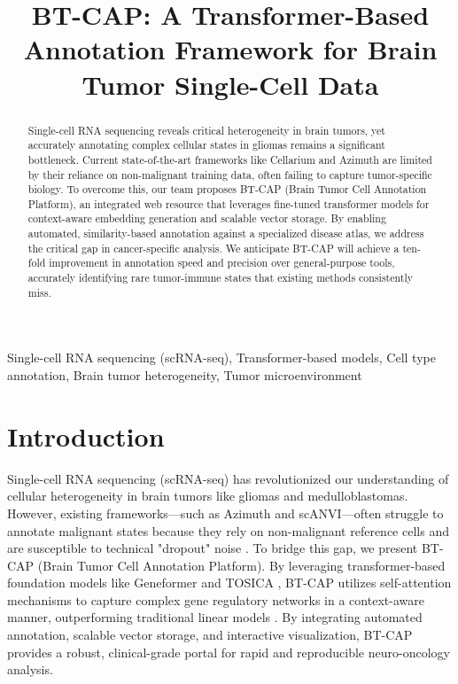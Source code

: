 \documentclass[conference]{IEEEtran}
\begin{document}
\title{BT-CAP: A Transformer-Based Annotation Framework for Brain Tumor Single-Cell Data
\\}

\author{
\and
{}
}

\maketitle

\begin{abstract}
Single-cell RNA sequencing reveals critical heterogeneity in brain tumors, yet accurately annotating complex cellular states in gliomas remains a significant bottleneck. Current state-of-the-art frameworks like Cellarium and Azimuth are limited by their reliance on non-malignant training data, often failing to capture tumor-specific biology. To overcome this, our team proposes BT-CAP (Brain Tumor Cell Annotation Platform), an integrated web resource that leverages fine-tuned transformer models for context-aware embedding generation and scalable vector storage. By enabling automated, similarity-based annotation against a specialized disease atlas, we address the critical gap in cancer-specific analysis. We anticipate BT-CAP will achieve a ten-fold improvement in annotation speed and precision over general-purpose tools, accurately identifying rare tumor-immune states that existing methods consistently miss.
\end{abstract}

\begin{IEEEkeywords}
Single-cell RNA sequencing (scRNA-seq), Transformer-based models, Cell type annotation, Brain tumor heterogeneity, Tumor microenvironment
\end{IEEEkeywords}

\section{Introduction}
Single-cell RNA sequencing (scRNA-seq) has revolutionized our understanding of cellular heterogeneity in brain tumors like gliomas and medulloblastomas. However, existing frameworks—such as Azimuth and scANVI—often struggle to annotate malignant states because they rely on non-malignant reference cells and are susceptible to technical "dropout" noise \cite{CHAUHAN2025100371}. To bridge this gap, we present BT-CAP (Brain Tumor Cell Annotation Platform). By leveraging transformer-based foundation models like Geneformer \cite{theodoris2023transfer} and TOSICA \cite{chen2023transformer}, BT-CAP utilizes self-attention mechanisms to capture complex gene regulatory networks in a context-aware manner, outperforming traditional linear models \cite{szalata2024transformers}. By integrating automated annotation, scalable vector storage, and interactive visualization, BT-CAP provides a robust, clinical-grade portal for rapid and reproducible neuro-oncology analysis.
\end{document}
